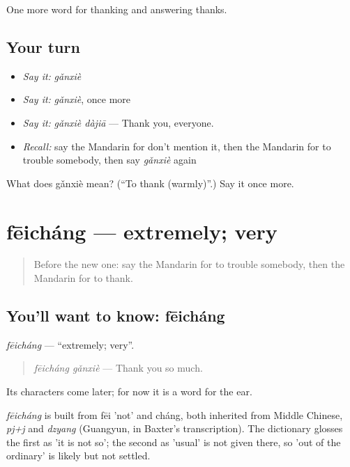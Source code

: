 \begin{grammarlens}[title={What you've built}]
One more word for thanking and answering thanks.
\end{grammarlens}

\subsection*{Your turn}
\begin{itemize}
\raggedright
  \item \emph{Say it:} \emph{gǎnxiè}
  \item \emph{Say it:} \emph{gǎnxiè}, once more
  \item \emph{Say it:} \emph{gǎnxiè dàjiā} — Thank you, everyone.
  \item \emph{Recall:} say the Mandarin for don't mention it, then the Mandarin for to trouble somebody, then say \emph{gǎnxiè} again
\end{itemize}

\begin{tcolorbox}[breakable,colback=teal!4,colframe=teal!35!black,title={Before you move on}]
What does gǎnxiè mean? (\textquotedblleft{}To thank (warmly)\textquotedblright{}.) Say it once more.
\end{tcolorbox}
\section[fēicháng]{fēicháng — extremely; very}

\label{lesson:ZH-C77-feichang}



\begin{quote}
Before the new one: say the Mandarin for to trouble somebody, then the Mandarin for to thank.
\end{quote}

\subsection*{You'll want to know: fēicháng}
\emph{fēicháng} — \textquotedblleft{}extremely; very\textquotedblright{}.

\begin{quote}
\emph{fēicháng gǎnxiè} — Thank you so much.
\end{quote}

Its characters come later; for now it is a word for the ear.

\begin{cousinweb}
\emph{fēicháng} is built from fēi 'not' and cháng, both inherited from Middle Chinese, \emph{pj+j} and \emph{dzyang} (Guangyun, in Baxter's transcription). The dictionary glosses the first as 'it is not so'; the second as 'usual' is not given there, so 'out of the ordinary' is likely but not settled.
\end{cousinweb}

